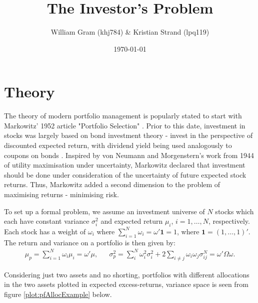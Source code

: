 \documentclass[11pt,a4paper,oneside]{article}
\title{The Investor's Problem}
\author{William Gram (khj784) \& Kristian Strand (lpq119)}
\date{\today}
\newcommand{\lp}{\left(}
\newcommand{\rp}{\right)}
\begin{document}
\maketitle

\newpage

\rfoot{\thepage}

\tableofcontents

\newpage

\setcounter{page}{1}

\section{Theory}
The theory of modern portfolio management is popularly stated to start with Markowitz' 1952 article "Portfolio Selection" \cite{MPT52}. Prior to this date, investment in stocks was largely based on bond investment theory - invest in the perspective of discounted expected return, with dividend yield being used analogously to coupons on bonds \cite{guerard2016}. Inspired by von Neumann and Morgenstern's work from 1944 \cite{vnm1944} of utility maximisation under uncertainty, Markowitz declared that investment should be done under consideration of the uncertainty of future expected stock returns. Thus, Markowitz added a second dimension to the problem of maximising returns - minimising risk.

To set up a formal problem, we assume an investment universe of $N$ stocks which each have constant variance $\sigma_i^2$ and expected return $\mu_i$, $i = 1, \dots, N$, respectively. Each stock has a weight of $\omega_i$ where $\sum_{i = 1}^N \omega_i = \omega'\mathbf{1} = 1$, where $\mathbf{1} = \lp 1, \dots, 1\rp'$. The return and variance on a portfolio is then given by:
\begin{align*}
    \mu_p = \sum_{i=1}^N \omega_i \mu_i = \omega'\mu, &&
    \sigma_p^2 = \sum_{i}^N \omega_i^2 \sigma_i^2 + 2 \sum_{i\neq j} \omega_i\omega_j \sigma_{ij}^N = \omega'\Omega \omega.
\end{align*}

Considering just two assets and no shorting, portfolios with different allocations in the two assets plotted in expected excess-returns, variance space is seen from figure \ref{plot:pfAllocExample} below.
\end{document}
